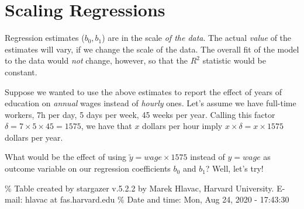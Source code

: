 \documentclass[]{book}
\newenvironment{tip}{\begin{tcolorbox}[colback=green!5!white,colframe=green]}{\end{tcolorbox}}
\begin{document}
\hypertarget{scaling-regressions}{%
\section{Scaling Regressions}\label{scaling-regressions}}

\begin{tip}
Regression estimates (\(b_0, b_1\)) are in the scale \emph{of the data}.
The actual \emph{value} of the estimates will vary, if we change the
scale of the data. The overall fit of the model to the data would
\emph{not} change, however, so that the \(R^2\) statistic would be
constant.
\end{tip}

Suppose we wanted to use the above estimates to report the effect of years of education on \emph{annual} wages instead of \emph{hourly} ones. Let's assume we have full-time workers, 7h per day, 5 days per week, 45 weeks per year. Calling this factor \(\delta = 7 \times 5 \times 45 = 1575\), we have that \(x\) dollars per hour imply \(x \times \delta = x \times 1575\) dollars per year.

What would be the effect of using \(\tilde{y} = wage \times 1575\) instead of \(y = wage\) as outcome variable on our regression coefficients \(b_0\) and \(b_1\)? Well, let's try!

\% Table created by stargazer v.5.2.2 by Marek Hlavac, Harvard University. E-mail: hlavac at fas.harvard.edu
\% Date and time: Mon, Aug 24, 2020 - 17:43:30
\end{document}
